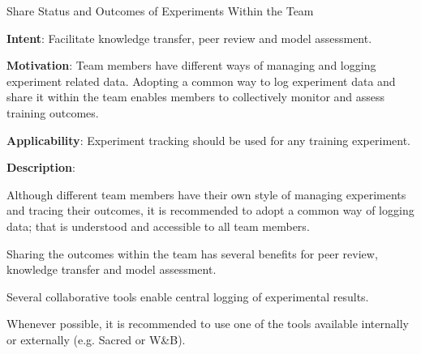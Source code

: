   
  \begin{frame}[plain]{ Share Status and Outcomes of Experiments Within the Team
 }

  \textbf{Intent}: Facilitate knowledge transfer, peer review and model assessment. 
 

  \textbf{Motivation}: Team members have different ways of managing and logging experiment related data. Adopting a common way to log experiment data and share it within the team enables members to collectively monitor and assess training outcomes. 
 

  \textbf{Applicability}: Experiment tracking should be used for any training experiment.
 

  \textbf{Description}: 

Although different team members have their own style of managing experiments and tracing their outcomes, it is recommended to adopt a common way of logging data; that is understood and accessible to all team members.


Sharing the outcomes within the team has several benefits for peer review, knowledge transfer and model assessment.


Several collaborative tools enable central logging of experimental results.


Whenever possible, it is recommended to use one of the tools available internally or externally (e.g. Sacred or W\&B).


 


  \end{frame}

